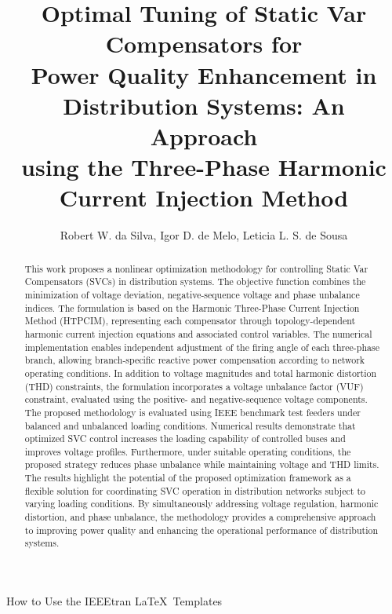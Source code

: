 \documentclass[journal]{IEEEtran}
\begin{document}
\title{Optimal Tuning of Static Var Compensators for\\ Power Quality Enhancement in Distribution Systems: An Approach \\ using the Three-Phase Harmonic Current Injection Method}
\author{Robert W. da Silva, Igor D. de Melo, Leticia L. S. de Sousa
}

%
{How to Use the IEEEtran \LaTeX \ Templates}

\maketitle

\begin{abstract}
This work proposes a nonlinear optimization methodology for controlling Static Var Compensators (SVCs) in distribution systems. The objective function combines the minimization of voltage deviation, negative-sequence voltage and phase unbalance indices. The formulation is based on the Harmonic Three-Phase Current Injection Method (HTPCIM), representing each compensator through topology-dependent harmonic current injection equations and associated control variables. The numerical implementation enables independent adjustment of the firing angle of each three-phase branch, allowing branch-specific reactive power compensation according to network operating conditions. In addition to voltage magnitudes and total harmonic distortion (THD) constraints, the formulation incorporates a voltage unbalance factor (VUF) constraint, evaluated using the positive- and negative-sequence voltage components. The proposed methodology is evaluated using IEEE benchmark test feeders under balanced and unbalanced loading conditions. Numerical results demonstrate that optimized SVC control increases the loading capability of controlled buses and improves voltage profiles. Furthermore, under suitable operating conditions, the proposed strategy reduces phase unbalance while maintaining voltage and THD limits. The results highlight the potential of the proposed optimization framework as a flexible solution for coordinating SVC operation in distribution networks subject to varying loading conditions. By simultaneously addressing voltage regulation, harmonic distortion, and phase unbalance, the methodology provides a comprehensive approach to improving power quality and enhancing the operational performance of distribution systems.
\end{abstract}
\end{document}
